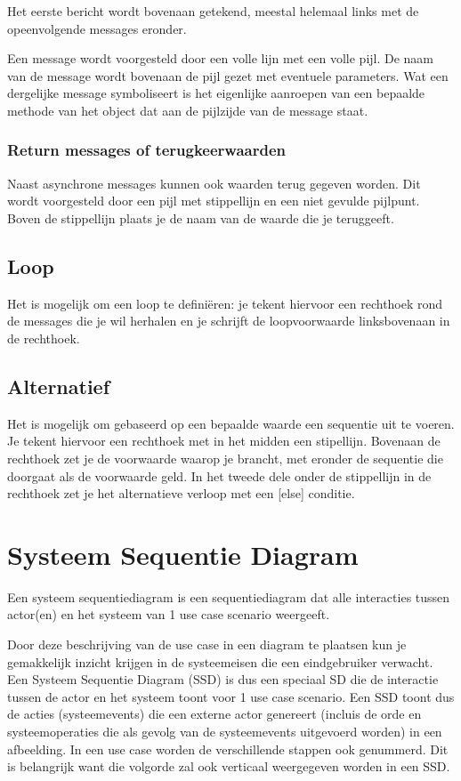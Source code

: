 Het eerste bericht wordt bovenaan getekend, meestal helemaal links met de opeenvolgende messages eronder. 

Een message wordt voorgesteld door een volle lijn met een volle pijl. De naam van de message wordt bovenaan de pijl gezet met eventuele parameters. Wat een dergelijke message symboliseert is het eigenlijke aanroepen van een bepaalde methode van het object dat aan de pijlzijde van de message staat.

\subsubsection{Return messages of terugkeerwaarden}
Naast asynchrone messages kunnen ook waarden terug gegeven worden. Dit wordt voorgesteld door een pijl met stippellijn en een niet gevulde pijlpunt. Boven de stippellijn plaats je de naam van de waarde die je teruggeeft. 


\subsection{Loop}
Het is mogelijk om een loop te defini\"eren: je tekent hiervoor een rechthoek rond de messages die je wil herhalen en je schrijft de loopvoorwaarde linksbovenaan in de rechthoek. 

\subsection{Alternatief}
Het is mogelijk om gebaseerd op een bepaalde waarde een sequentie uit te voeren. Je tekent hiervoor een rechthoek met in het midden een stipellijn. Bovenaan de rechthoek zet je de voorwaarde waarop je brancht, met eronder de sequentie die doorgaat als de voorwaarde geld. In het tweede dele onder de stippellijn in de rechthoek zet je het alternatieve verloop met een [else] conditie. 

\section{Systeem Sequentie Diagram}
\begin{definition}
Een systeem sequentiediagram is een sequentiediagram dat alle interacties tussen actor(en) en het systeem van 1 use case scenario weergeeft. 
\end{definition}

Door deze beschrijving van de use case in een diagram te plaatsen kun je gemakkelijk inzicht krijgen in de systeemeisen die een eindgebruiker verwacht. Een Systeem Sequentie Diagram (SSD) is dus een speciaal SD die de interactie tussen de actor en het systeem toont voor 1 use case scenario. Een SSD toont dus de acties (systeemevents) die een externe actor genereert (incluis de orde en systeemoperaties die als gevolg van de systeemevents uitgevoerd worden) in een afbeelding. In een use case worden de verschillende stappen ook genummerd. Dit is belangrijk want die volgorde zal ook verticaal weergegeven worden in een SSD.

